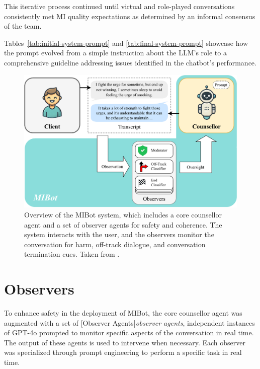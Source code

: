 This iterative process continued until virtual and role-played conversations consistently met MI quality expectations as determined by an informal consensus of the team.


Tables~\ref{tab:initial-system-prompt} and \ref{tab:final-system-prompt} showcase how the prompt evolved from a simple instruction about the LLM's role to a comprehensive guideline addressing issues identified in the chatbot's performance.




\begin{figure}[ht]
  \centering
  \includegraphics[width=0.9\linewidth]{fig/sysdiag.pdf} 
  \caption[Overview of the MIBot system]{Overview of the MIBot system, which includes a core counsellor agent and a set of observer agents for safety and coherence. The system interacts with the user, and the observers monitor the conversation for harm, off-track dialogue, and conversation termination cues. Taken from \citet{mahmood-etal-2025-fully}.}
  \label{fig:sysdiag}
\end{figure}

\section{Observers}
\label{sec:observers}
To enhance safety in the deployment of MIBot, the core counsellor agent was augmented with a set of [Observer Agents]\textit{observer agents}, independent instances of GPT-4o prompted to monitor specific aspects of the conversation in real time.  The output of these agents is used to intervene when necessary. Each observer was specialized through prompt engineering to perform a specific task in real time.

